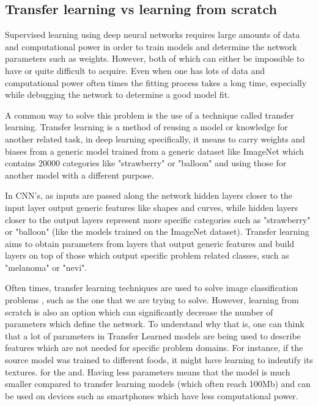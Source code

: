 \documentclass[journal,compsoc]{IEEEtran}
\begin{document}
\subsection{Transfer learning vs learning from scratch}
Supervised learning using deep neural networks requires large amounts of data and computational power in order to train models and determine the network parameters such as weights. However, both of which can either be impossible to have or quite difficult to acquire. Even when one has lots of data and computational power often times the fitting process takes a long time, especially while debugging the network to determine a good model fit.  \par
A common way to solve this problem is the use of a technique called transfer learning. Transfer learning is a method of reusing a model or knowledge for another related task\cite{DipanjanSarkarRaghavBali2018}, in deep learning specifically, it means to carry weights and biases from a generic model trained from a generic dataset like ImageNet which contains 20000 categories like "strawberry" or "balloon" and using those for another model with a different purpose. \par
In CNN's, as inputs are passed along the network hidden layers closer to the input layer output generic features like shapes and curves, while hidden layers closer to the output layers represent more specific categories such as "strawberry" or "balloon" (like the models trained on the ImageNet dataset). Transfer learning aims to obtain parameters from layers that output generic features and build layers on top of those which output specific problem related classes, such as "melanoma" or "nevi". \par
Often times, transfer learning techniques are used to solve image classification problems \cite{Ly2019}, such as the one that we are trying to solve. However, learning from scratch is also an option which can significantly decrease the number of parameters which define the network. To understand why that is, one can think that a lot of parameters in Transfer Learned models are being used to describe features which are not needed for specific problem domains. For instance, if the source model was trained to different foods, it might have learning to indentify its textures. for the and.  Having less parameters means that the model is much smaller compared to transfer learning models (which often reach 100Mb) and can be used on devices such as smartphones which have less computational power.
\end{document}
